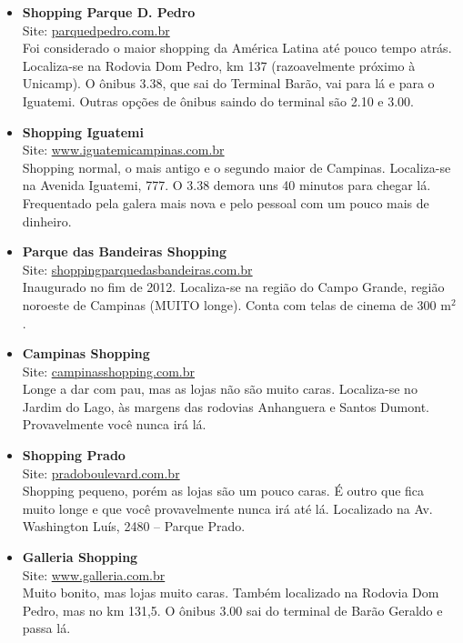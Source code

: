 \begin{itemize}
\item \textbf{Shopping Parque D. Pedro}
  \\Site: \url{parquedpedro.com.br}
  \\Foi considerado o maior shopping da América Latina até pouco tempo atrás.
  Localiza-se na Rodovia Dom Pedro, km 137 (razoavelmente próximo à Unicamp).
  O ônibus 3.38, que sai do Terminal Barão, vai para lá e para o Iguatemi.
  Outras opções de ônibus saindo do terminal são 2.10 e 3.00.

\item \textbf{Shopping Iguatemi}
  \\Site: \url{www.iguatemicampinas.com.br}
  \\Shopping normal, o mais antigo e o segundo maior de Campinas. Localiza-se
  na Avenida Iguatemi, 777. O 3.38 demora uns 40 minutos para chegar lá.
  Frequentado pela galera mais nova e pelo pessoal com um pouco mais de
  dinheiro.

\item \textbf{Parque das Bandeiras Shopping}
  \\Site: \url{shoppingparquedasbandeiras.com.br}
  \\Inaugurado no fim de 2012. Localiza-se na região do Campo Grande, região
  noroeste de Campinas (MUITO longe). Conta com telas de cinema de 300 m$^{2}$.

\item \textbf{Campinas Shopping}
  \\Site: \url{campinasshopping.com.br}
  \\Longe a dar com pau, mas as lojas não são muito caras. Localiza-se no
  Jardim do Lago, às margens das rodovias Anhanguera e Santos Dumont.
  Provavelmente você nunca irá lá.

\item \textbf{Shopping Prado}
  \\Site: \url{pradoboulevard.com.br}
  \\Shopping pequeno, porém as lojas são um pouco caras. É outro que fica muito
  longe e que você provavelmente nunca irá até lá. Localizado na Av. Washington
  Luís, 2480 -- Parque Prado.

\item \textbf{Galleria Shopping}
  \\Site: \url{www.galleria.com.br}
  \\Muito bonito, mas lojas muito caras. Também localizado na Rodovia Dom
  Pedro, mas no km 131,5. O ônibus 3.00 sai do terminal de Barão Geraldo e
  passa lá.


\end{itemize}
